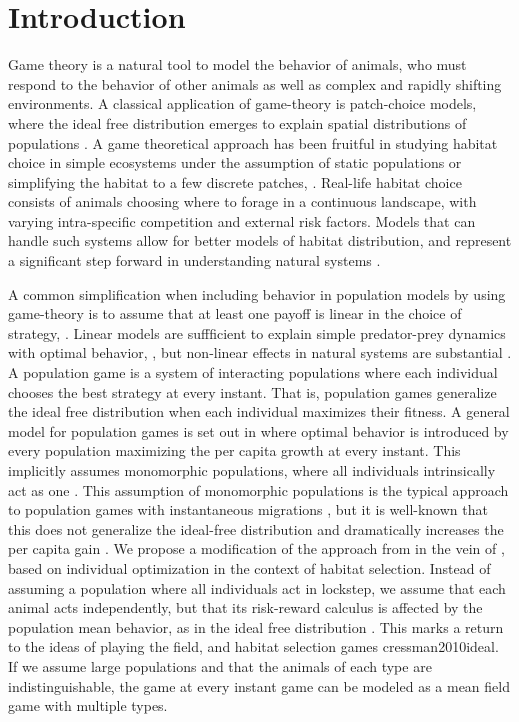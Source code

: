 \section{Introduction}
Game theory is a natural tool to model the behavior of animals, who must respond to the behavior of other animals as well as complex and rapidly shifting environments. A classical application of game-theory is patch-choice models, where the ideal free distribution emerges to explain spatial distributions of populations \citep{cressman2004ideal}. A game theoretical approach has been fruitful in studying habitat choice in simple ecosystems under the assumption of static populations or simplifying the habitat to a few discrete patches, \citep{cressman2010ideal, valdovinos2010consequences}. Real-life habitat choice consists of animals choosing where to forage in a continuous landscape, with varying intra-specific competition and external risk factors. Models that can handle such systems allow for better models of habitat distribution, and represent a significant step forward in understanding natural systems \citep{morris2003shadows}.

A common simplification when including behavior in population models by using game-theory is to assume that at least one payoff is linear in the choice of strategy, \citep{krivan1997dynamic}. Linear models are suffficient to explain simple predator-prey dynamics with optimal behavior, \citep{kvrivan2007lotka}, but non-linear effects in natural systems are substantial \citep{gross2009generalized}. A population game is a system of interacting populations where each individual chooses the best strategy at every instant. That is, population games generalize the ideal free distribution \citep{cressman2004ideal} when each individual maximizes their fitness. A general model for population games is set out in \citep{vincent2005evolutionary} where optimal behavior is introduced by every population maximizing the per capita growth at every instant.  This implicitly assumes monomorphic populations, where all individuals intrinsically act as one \citep{malone2020ecology,stump2017optimally}. This assumption of monomorphic populations is the typical approach to population games with instantaneous migrations  \citep{kvrivan2013behavioral, vincent2005evolutionary}, but it is well-known that this does not generalize the ideal-free distribution and dramatically increases the per capita gain \citep{kvrivan2008ideal}. We propose a modification of the approach from \citep{vincent2005evolutionary} in the vein of \citep{cressman2010ideal}, based on individual optimization in the context of habitat selection. Instead of assuming a population where all individuals act in lockstep, we assume that each animal acts independently, but that its risk-reward calculus is affected by the population mean behavior, as in the ideal free distribution \citep{fretwell1969territorial}. This marks a return to the ideas of playing the field, \citep{smith1982evolution} and habitat selection games {cressman2010ideal}. If we assume large populations and that the animals of each type are indistinguishable, the game at every instant game can be modeled as a mean field game with multiple types.


